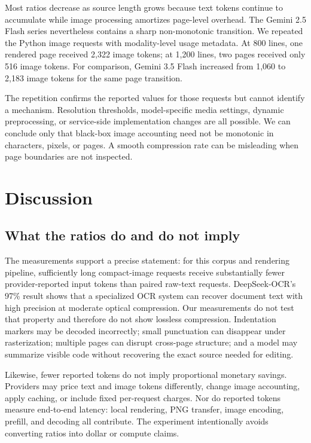 \documentclass[sigconf,nonacm]{acmart}
\begin{document}
Most ratios decrease as source length grows because text tokens continue to
accumulate while image processing amortizes page-level overhead. The Gemini
2.5 Flash series nevertheless contains a sharp non-monotonic transition. We
repeated the Python image requests with modality-level usage metadata. At 800
lines, one rendered page received 2,322 image tokens; at 1,200 lines, two pages
received only 516 image tokens. For comparison, Gemini 3.5 Flash increased from
1,060 to 2,183 image tokens for the same page transition.

The repetition confirms the reported values for those requests but cannot
identify a mechanism. Resolution thresholds, model-specific media settings,
dynamic preprocessing, or service-side implementation changes are all possible.
We can conclude only that black-box image accounting need not be monotonic in
characters, pixels, or pages. A smooth compression rate can be misleading when
page boundaries are not inspected.

\section{Discussion}

\subsection{What the ratios do and do not imply}

The measurements support a precise statement: for this corpus and rendering
pipeline, sufficiently long compact-image requests receive substantially fewer
provider-reported input tokens than paired raw-text requests. DeepSeek-OCR's
97\% result shows that a specialized OCR system can recover document text with
high precision at moderate optical compression. Our measurements do not test
that property and therefore do not show lossless compression. Indentation
markers may be decoded incorrectly; small punctuation can disappear under
rasterization; multiple pages can disrupt cross-page structure; and a model may
summarize visible code without recovering the exact source needed for editing.

Likewise, fewer reported tokens do not imply proportional monetary savings.
Providers may price text and image tokens differently, change image accounting,
apply caching, or include fixed per-request charges. Nor do reported tokens
measure end-to-end latency: local rendering, PNG transfer, image encoding,
prefill, and decoding all contribute. The experiment intentionally avoids
converting ratios into dollar or compute claims.
\end{document}
